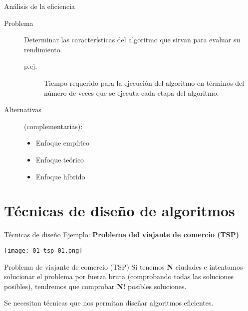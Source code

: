 \begin{frame}[c]{Análisis de la eficiencia}
  \begin{description}
    \item[Problema] Determinar las características del algoritmo que sirvan para
      evaluar su rendimiento.
      \vspace{\baselineskip}
      \begin{description}
        \item[p.ej.] Tiempo requerido para la ejecución del algoritmo en términos del
          número de veces que se ejecuta cada etapa del algoritmo.
      \end{description}
      \vspace{\baselineskip}

    \item[Alternativas] (complementarias):
      \begin{itemize}
        \item Enfoque empírico
        \item Enfoque teórico
        \item Enfoque híbrido
      \end{itemize}
  \end{description}
\end{frame}

\section{Técnicas de diseño de algoritmos}

\begin{frame}[c]{Técnicas de diseño}
  Ejemplo: \textbf{Problema del viajante de comercio (TSP)}
  \begin{center}
    \texttt{[image: 01-tsp-01.png]}
  \end{center}
\end{frame}

\begin{frame}[c]{Problema de viajante de comercio (TSP)}
  Si tenemos \textbf{N} ciudades e intentamos solucionar el problema por fuerza
  bruta (comprobando todas las soluciones posibles), tendremos que comprobar
  \textbf{N!} posibles soluciones.

  \vspace{\baselineskip}
  \begin{alertblock}{}
    Se necesitan técnicas que nos permitan diseñar algoritmos eficientes.
  \end{alertblock}
\end{frame}

